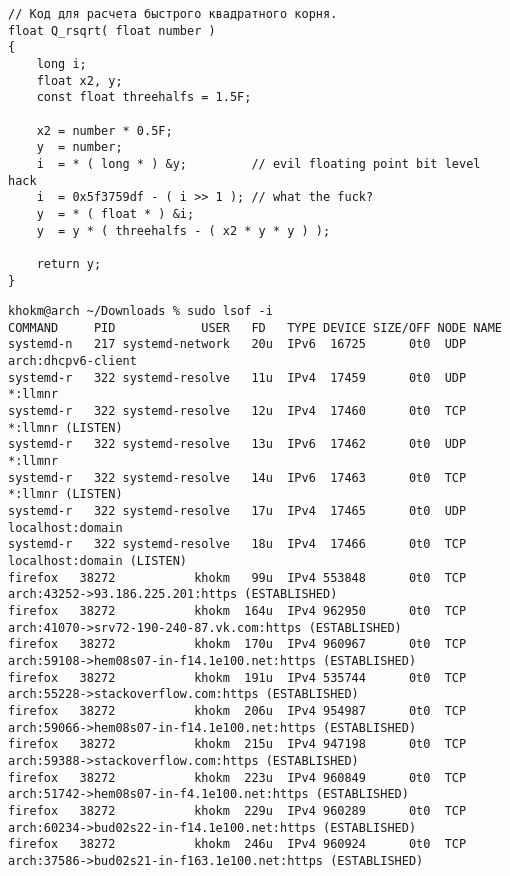 \begin{codewrap}
\begin{verbatim}
// Код для расчета быстрого квадратного корня.
float Q_rsqrt( float number )
{
    long i;
    float x2, y;
    const float threehalfs = 1.5F;

    x2 = number * 0.5F;
    y  = number;
    i  = * ( long * ) &y;         // evil floating point bit level hack
    i  = 0x5f3759df - ( i >> 1 ); // what the fuck?
    y  = * ( float * ) &i;
    y  = y * ( threehalfs - ( x2 * y * y ) );

    return y;
}
\end{verbatim}
\caption{}\label{src:quake}
\end{codewrap}

\begin{codewrap}
\begin{verbatim}
khokm@arch ~/Downloads % sudo lsof -i   
COMMAND     PID            USER   FD   TYPE DEVICE SIZE/OFF NODE NAME
systemd-n   217 systemd-network   20u  IPv6  16725      0t0  UDP arch:dhcpv6-client 
systemd-r   322 systemd-resolve   11u  IPv4  17459      0t0  UDP *:llmnr 
systemd-r   322 systemd-resolve   12u  IPv4  17460      0t0  TCP *:llmnr (LISTEN)
systemd-r   322 systemd-resolve   13u  IPv6  17462      0t0  UDP *:llmnr 
systemd-r   322 systemd-resolve   14u  IPv6  17463      0t0  TCP *:llmnr (LISTEN)
systemd-r   322 systemd-resolve   17u  IPv4  17465      0t0  UDP localhost:domain 
systemd-r   322 systemd-resolve   18u  IPv4  17466      0t0  TCP localhost:domain (LISTEN)
firefox   38272           khokm   99u  IPv4 553848      0t0  TCP arch:43252->93.186.225.201:https (ESTABLISHED)
firefox   38272           khokm  164u  IPv4 962950      0t0  TCP arch:41070->srv72-190-240-87.vk.com:https (ESTABLISHED)
firefox   38272           khokm  170u  IPv4 960967      0t0  TCP arch:59108->hem08s07-in-f14.1e100.net:https (ESTABLISHED)
firefox   38272           khokm  191u  IPv4 535744      0t0  TCP arch:55228->stackoverflow.com:https (ESTABLISHED)
firefox   38272           khokm  206u  IPv4 954987      0t0  TCP arch:59066->hem08s07-in-f14.1e100.net:https (ESTABLISHED)
firefox   38272           khokm  215u  IPv4 947198      0t0  TCP arch:59388->stackoverflow.com:https (ESTABLISHED)
firefox   38272           khokm  223u  IPv4 960849      0t0  TCP arch:51742->hem08s07-in-f4.1e100.net:https (ESTABLISHED)
firefox   38272           khokm  229u  IPv4 960289      0t0  TCP arch:60234->bud02s22-in-f14.1e100.net:https (ESTABLISHED)
firefox   38272           khokm  246u  IPv4 960924      0t0  TCP arch:37586->bud02s21-in-f163.1e100.net:https (ESTABLISHED)

\end{verbatim}
\end{codewrap}

